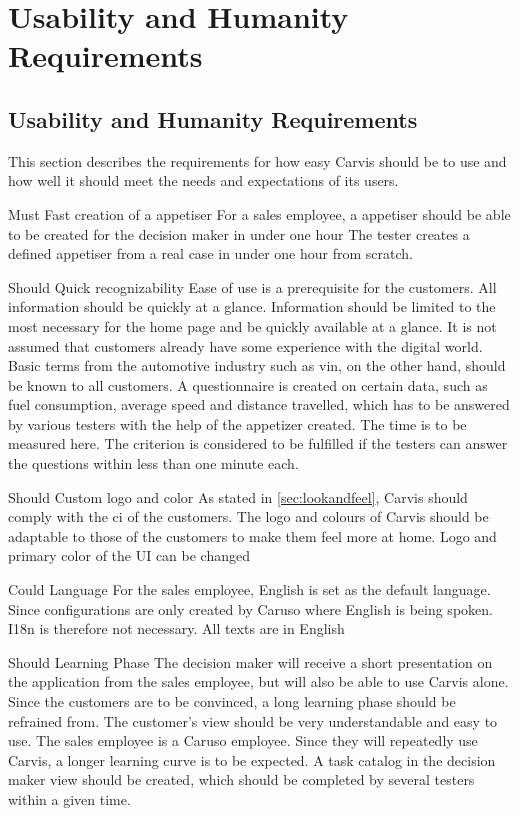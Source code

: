 \chapter{Usability and Humanity Requirements}


\section{Usability and Humanity Requirements}
This section describes the requirements for how easy Carvis should be to use and how well it should meet the needs and expectations of its users.

{Must}
{Fast creation of a \gls{appetiser}}
{For a sales employee, a \gls{appetiser} should be able to be created for the decision maker in under one hour}
{The tester creates a defined \gls{appetiser} from a real case in under one hour from scratch.}

{Should}
{Quick recognizability}
{Ease of use is a prerequisite for the customers. All information should be quickly at a glance. Information should be limited to the most necessary for the home page and be quickly available at a glance. It is not assumed that customers already have some experience with the digital world. Basic terms from the automotive industry such as \gls{vin}, on the other hand, should be known to all customers.}
{A questionnaire is created on certain data, such as fuel consumption, average speed and distance travelled, which has to be answered by various testers with the help of the appetizer created. The time is to be measured here. The criterion is considered to be fulfilled if the testers can answer the questions within less than one minute each.}

{Should}
{Custom logo and color}
{As stated in \autoref{sec:lookandfeel}, Carvis should comply with the \gls{ci} of the customers. The logo and colours of Carvis should be adaptable to those of the customers to make them feel more at home.}
{Logo and primary color of the UI can be changed}

{Could}
{Language}
{For the sales employee, English is set as the default language. Since configurations are only created by Caruso where English is being spoken. I18n is therefore not necessary.}
{All texts are in English}


{Should}
{Learning Phase}
{The decision maker will receive a short presentation on the application from the sales employee, but will also be able to use Carvis alone. Since the customers are to be convinced, a long learning phase should be refrained from. The customer's view should be very understandable and easy to use. The sales employee is a Caruso employee. Since they will repeatedly use Carvis, a longer learning curve is to be expected. }
{A task catalog in the decision maker view should be created, which should be completed by several testers within a given time.}